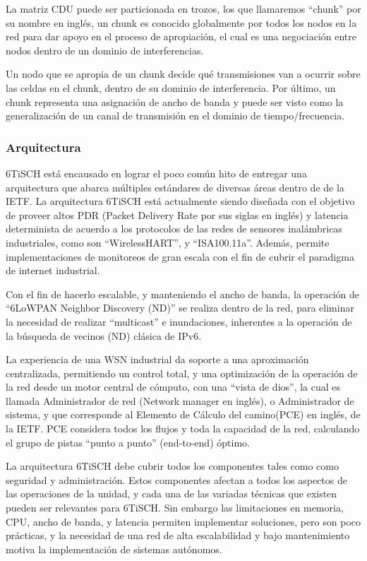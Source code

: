 La matriz CDU puede ser particionada en trozos, los que llamaremos ``chunk'' por su nombre en inglés, un chunk es conocido globalmente por todos los nodos en la red para dar apoyo en el proceso de apropiación, el cual es una negociación entre nodos dentro de un dominio de interferencias.

Un nodo que se apropia de un chunk decide qué transmisiones van a ocurrir sobre las celdas en el chunk, dentro de su dominio de interferencia. Por último, un chunk representa una asignación de ancho de banda y puede ser visto como la generalización de un canal de transmisión en el dominio de tiempo/frecuencia.

\newpage
\subsubsection{Arquitectura}

6TiSCH está encausado en lograr el poco común hito de entregar una arquitectura que abarca múltiples estándares de diversas áreas dentro de de la IETF. La arquitectura 6TiSCH está actualmente siendo diseñada con el objetivo de proveer altos PDR (Packet Delivery Rate por sus siglas en inglés) y latencia determinista de acuerdo a los protocolos de las redes de sensores inalámbricas industriales, como son ``WirelessHART'', y ``ISA100.11a''. Además, permite implementaciones de monitoreos de gran escala con el fin de cubrir el paradigma de internet industrial.

Con el fin de hacerlo escalable, y manteniendo el ancho de banda, la operación de ``6LoWPAN Neighbor Discovery (ND)'' se realiza dentro de la red, para eliminar la necesidad de realizar ``multicast'' e inundaciones, inherentes a la operación de la búsqueda de vecinos (ND) clásica de IPv6.

La experiencia de una WSN industrial da soporte a una aproximación centralizada, permitiendo un control total, y una optimización de la operación de la red desde un motor central de cómputo, con una “vista de dios”, la cual es llamada Administrador de red (Network manager en inglés), o Administrador de sistema, y que corresponde al Elemento de Cálculo del camino(PCE) en inglés, de la IETF. PCE considera todos los flujos y toda la capacidad de la red, calculando el grupo de pistas ``punto a punto'' (end-to-end) óptimo.

La arquitectura 6TiSCH debe cubrir todos los componentes tales como como seguridad y administración. Estos componentes afectan a todos los aspectos de las operaciones de la unidad, y cada una de las variadas técnicas que existen pueden ser relevantes para 6TiSCH. Sin embargo las limitaciones en memoria, CPU, ancho de banda, y latencia permiten implementar soluciones, pero son poco prácticas, y la necesidad de una red de alta escalabilidad y bajo mantenimiento motiva la implementación de sistemas autónomos.

